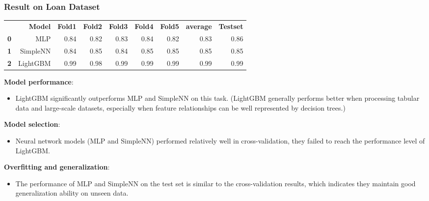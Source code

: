 \documentclass[10pt]{beamer}
\begin{document}
\begin{frame}
\frametitle{Result on Loan Dataset}
\begin{table}
\centering
\scriptsize
\begin{tabularx}{\textwidth}{rrrrrrrrr}
 & \textbf{Model} & \textbf{Fold1} & \textbf{Fold2} & \textbf{Fold3} & \textbf{Fold4} & \textbf{Fold5} & \textbf{average} & \textbf{Testset} \\
\textbf{0} & MLP & 0.84 & 0.82 & 0.83 & 0.84 & 0.82 & 0.83 & 0.86 \\
\textbf{1} & SimpleNN & 0.84 & 0.85 & 0.84 & 0.85 & 0.85 & 0.85 & 0.85 \\
\textbf{2} & LightGBM & 0.99 & 0.98 & 0.99 & 0.99 & 0.99 & 0.99 & 0.99
\end{tabularx}
\end{table}

\scriptsize
\textbf{Model performance}: 
\begin{itemize}
\item LightGBM significantly outperforms MLP and SimpleNN on this task.
(LightGBM generally performs better when processing tabular data and large-scale datasets, especially when feature relationships can be well represented by decision trees.)
\end{itemize}

\textbf{Model selection}:
\begin{itemize} 
\item Neural network models (MLP and SimpleNN) performed relatively well in cross-validation, they failed to reach the performance level of LightGBM.
\end{itemize}

\textbf{Overfitting and generalization}:
\begin{itemize}
\item The performance of MLP and SimpleNN on the test set is similar to the cross-validation results, which indicates they maintain good generalization ability on unseen data.
\end{itemize}
\end{frame}
\end{document}
